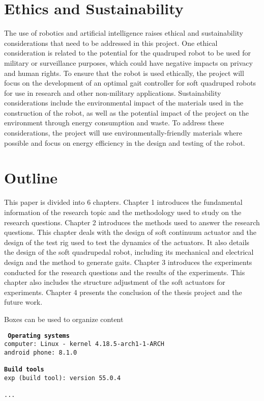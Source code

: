 \section{Ethics and Sustainability}
The use of robotics and artificial intelligence raises ethical and sustainability considerations that need to be addressed in this project. One ethical consideration is related to the potential for the quadruped robot to be used for military or surveillance purposes, which could have negative impacts on privacy and human rights. To ensure that the robot is used ethically, the project will focus on the development of an optimal gait controller for soft quadruped robots for use in research and other non-military applications. Sustainability considerations include the environmental impact of the materials used in the construction of the robot, as well as the potential impact of the project on the environment through energy consumption and waste. To address these considerations, the project will use environmentally-friendly materials where possible and focus on energy efficiency in the design and testing of the robot.

\section{Outline}
This paper is divided into 6 chapters. Chapter 1 introduces the fundamental information of the research topic and the methodology used to study on the research questions. Chapter 2 introduces the methods used to answer the research questions. This chapter deals with the design of soft continuum actuator and the design of the test rig used to test the dynamics of the actuators. It also details the design of the soft quadrupedal robot, including its mechanical and electrical design and the method to generate gaits. Chapter 3 introduces the experiments conducted for the research questions and the results of the experiments. This chapter also includes the structure adjustment of the soft actuators for experiments. Chapter 4 presents the conclusion of the thesis project and the future work.

Boxes can be used to organize content
\begin{tcolorbox}[title={Development environment for prototype}]
	\tt{
		\textbf{Operating systems }\\
		computer: Linux - kernel 4.18.5-arch1-1-ARCH\\
		android phone: 8.1.0\\
		~\\
		\textbf{Build tools}\\
		exp (build tool): version 55.0.4\\
		~\\
		...
	}
\end{tcolorbox}